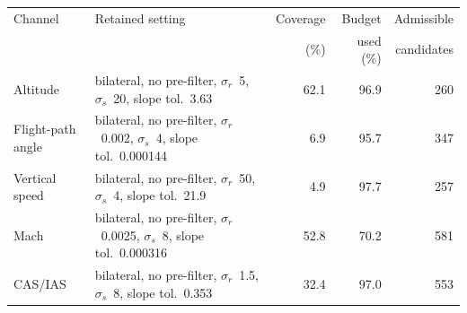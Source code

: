 \begin{tabular}{llrrr}
\toprule
Channel & Retained setting & Coverage & Budget & Admissible \\
 & & (\%) & used (\%) & candidates \\
\midrule
Altitude & bilateral, no pre-filter, $\sigma_r$~5, $\sigma_s$~20, slope tol.~3.63 & 62.1 & 96.9 & 260 \\
Flight-path angle & bilateral, no pre-filter, $\sigma_r$~0.002, $\sigma_s$~4, slope tol.~0.000144 & 6.9 & 95.7 & 347 \\
Vertical speed & bilateral, no pre-filter, $\sigma_r$~50, $\sigma_s$~4, slope tol.~21.9 & 4.9 & 97.7 & 257 \\
Mach & bilateral, no pre-filter, $\sigma_r$~0.0025, $\sigma_s$~8, slope tol.~0.000316 & 52.8 & 70.2 & 581 \\
CAS/IAS & bilateral, no pre-filter, $\sigma_r$~1.5, $\sigma_s$~8, slope tol.~0.353 & 32.4 & 97.0 & 553 \\
\bottomrule
\end{tabular}
